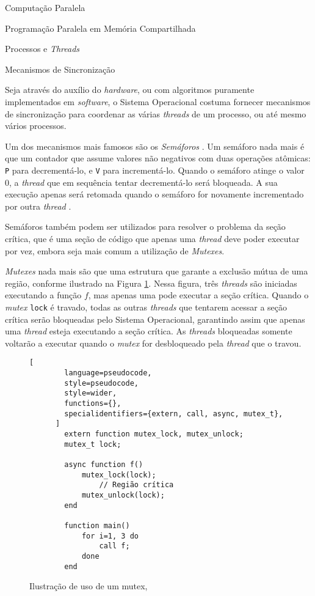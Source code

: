 \begin{section}{Computação Paralela}
\begin{subsection}{Programação Paralela em Memória Compartilhada}
\begin{subsubsection}{Processos e \textit{Threads}}
\end{subsubsection}

\begin{subsubsection}{Mecanismos de Sincronização}

	Seja através do auxílio do \textit{hardware}, ou com algoritmos
puramente implementados em \textit{software}, o Sistema Operacional
costuma fornecer mecanismos de sincronização para coordenar as várias
\textit{threads} de um processo, ou até mesmo vários processos.

    Um dos mecanismos mais famosos são os \textit{Semáforos}
\citep{dijkstra1965}. Um semáforo nada mais é que um contador que assume
valores não negativos com duas operações atômicas: \texttt{P} para
decrementá-lo, e \texttt{V} para incrementá-lo. Quando o semáforo atinge o
valor 0, a \textit{thread} que em sequência tentar decrementá-lo será bloqueada. A
sua execução apenas será retomada quando o semáforo for novamente incrementado
por outra \textit{thread} \citep{semaphore}.

    Semáforos também podem ser utilizados para resolver o problema da
seção crítica, que é uma seção de código que apenas uma \textit{thread}
deve poder executar por vez, embora seja mais comum a utilização
de \textit{Mutexes}.

\textit{Mutexes} nada mais são que uma estrutura que garante a exclusão
mútua de uma região, conforme ilustrado na Figura \ref{fig:mutex}. Nessa
figura, três \textit{threads} são iniciadas executando a função $f$, mas
apenas uma pode executar a seção crítica.
    Quando o \textit{mutex} \texttt{lock} é travado,
todas as outras \textit{threads} que tentarem acessar a seção crítica
serão bloqueadas pelo Sistema Operacional, garantindo assim que apenas
uma \textit{thread} esteja executando a seção crítica.
As \textit{threads} bloqueadas somente voltarão a executar quando o
    \textit{mutex} for desbloqueado pela \textit{thread} que o travou.
\begin{figure}
      \begin{lstlisting}[
        language=pseudocode,
        style=pseudocode,
        style=wider,
        functions={},
        specialidentifiers={extern, call, async, mutex_t},
      ]
        extern function mutex_lock, mutex_unlock;
        mutex_t lock;

        async function f()
            mutex_lock(lock);
                // Região crítica
            mutex_unlock(lock);
        end

        function main()
            for i=1, 3 do
                call f;
            done
        end
      \end{lstlisting}
      \caption{Ilustração de uso de um mutex,}
      \label{fig:mutex}
\end{figure}


\end{subsubsection}
\end{subsection}
\end{section}
